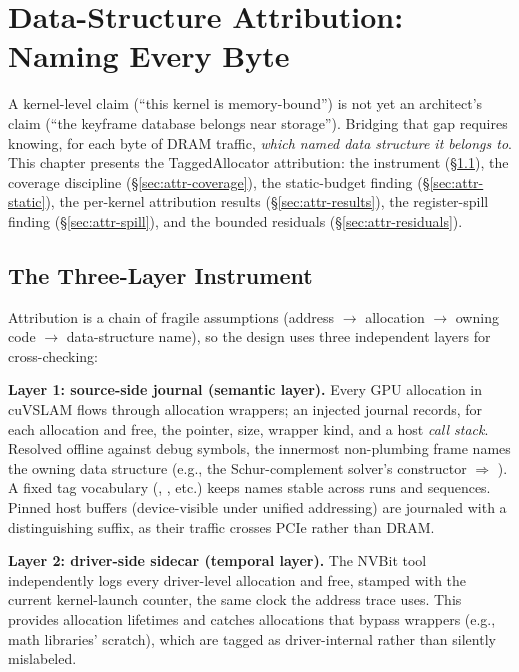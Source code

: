 \chapter{Data-Structure Attribution: Naming Every Byte}
\label{ch:attribution}

A kernel-level claim (“this kernel is memory-bound”) is not yet an architect’s claim (“the keyframe database belongs near storage”). Bridging that gap requires knowing, for each byte of DRAM traffic, \emph{which named data structure it belongs to}. This chapter presents the TaggedAllocator attribution: the instrument (\S\ref{sec:attr-design}), the coverage discipline (\S\ref{sec:attr-coverage}), the static-budget finding (\S\ref{sec:attr-static}), the per-kernel attribution results (\S\ref{sec:attr-results}), the register-spill finding (\S\ref{sec:attr-spill}), and the bounded residuals (\S\ref{sec:attr-residuals}).

\section{The Three-Layer Instrument}
\label{sec:attr-design}

Attribution is a chain of fragile assumptions (address $\rightarrow$ allocation $\rightarrow$ owning code $\rightarrow$ data-structure name), so the design uses three independent layers for cross-checking:

 \textbf{Layer 1: source-side journal (semantic layer).} Every GPU allocation in cuVSLAM flows through allocation wrappers; an injected journal records, for each allocation and free, the pointer, size, wrapper kind, and a host \emph{call stack}. Resolved offline against debug symbols, the innermost non-plumbing frame names the owning data structure (e.g., the Schur-complement solver’s constructor $\Rightarrow$ ). A fixed tag vocabulary (, , etc.) keeps names stable across runs and sequences. Pinned host buffers (device-visible under unified addressing) are journaled with a distinguishing suffix, as their traffic crosses PCIe rather than DRAM.

\textbf{Layer 2: driver-side sidecar (temporal layer).} The NVBit tool independently logs every driver-level allocation and free, stamped with the current kernel-launch counter, the same clock the address trace uses. This provides allocation lifetimes and catches allocations that bypass wrappers (e.g., math libraries’ scratch), which are tagged as driver-internal rather than silently mislabeled.


